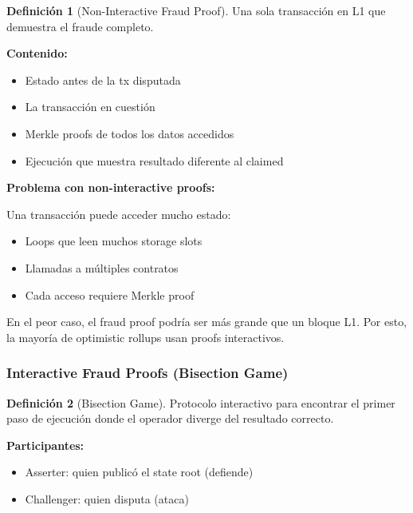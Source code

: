 \documentclass[11pt,a4paper,twoside,openright]{book}
\theoremstyle{definition}
\newtheorem{definition}{Definición}[chapter]
\theoremstyle{plain}
\theoremstyle{remark}
\begin{document}
\begin{definition}[Non-Interactive Fraud Proof]
Una sola transacción en L1 que demuestra el fraude completo.

\textbf{Contenido:}
\begin{itemize}
    \item Estado antes de la tx disputada
    \item La transacción en cuestión
    \item Merkle proofs de todos los datos accedidos
    \item Ejecución que muestra resultado diferente al claimed
\end{itemize}
\end{definition}

\begin{advertencia}
\textbf{Problema con non-interactive proofs:}

Una transacción puede acceder mucho estado:
\begin{itemize}
    \item Loops que leen muchos storage slots
    \item Llamadas a múltiples contratos
    \item Cada acceso requiere Merkle proof
\end{itemize}

En el peor caso, el fraud proof podría ser más grande que un bloque L1. Por esto, la mayoría de optimistic rollups usan proofs interactivos.
\end{advertencia}

\subsubsection{Interactive Fraud Proofs (Bisection Game)}

\begin{definition}[Bisection Game]
Protocolo interactivo para encontrar el primer paso de ejecución donde el operador diverge del resultado correcto.

\textbf{Participantes:}
\begin{itemize}
    \item Asserter: quien publicó el state root (defiende)
    \item Challenger: quien disputa (ataca)
\end{itemize}
\end{definition}
\end{document}
